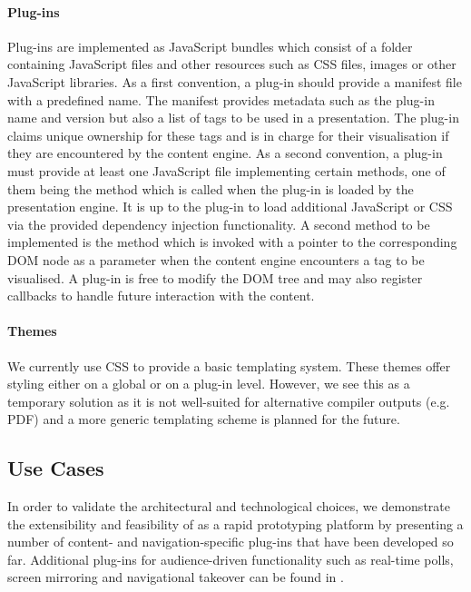 \documentclass[a4paper,12pt]{report}
\begin{document}
     \paragraph{Plug-ins} Plug-ins are implemented as JavaScript bundles which
      consist of a folder containing JavaScript files and other resources such
      as CSS files, images or other JavaScript libraries. As a first
      convention, a plug-in should provide a manifest file with a predefined
      name. The manifest provides metadata such as the plug-in name and version
      but also a list of tags to be used in a presentation. The plug-in claims
      unique ownership for these tags and is in charge for their visualisation
      if they are encountered by the content engine. As a second convention, a
      plug-in must provide at least one JavaScript file implementing certain
      methods, one of them being the  method which is called when
      the plug-in is loaded by the presentation engine. It is up to the plug-in
      to load additional JavaScript or CSS via the provided dependency
      injection functionality. A second method to be implemented is the
       method which is invoked with a pointer to the
      corresponding DOM node as a parameter when the content engine encounters
      a tag to be visualised. A plug-in is free to modify the DOM tree and may
      also register callbacks to handle future interaction with the content.

     \paragraph{Themes} We currently use CSS to provide a basic templating
      system. These themes offer styling either on a global or on a plug-in
      level. However, we see this as a temporary solution as it is not
      well-suited for alternative compiler outputs (e.g. PDF) and a more
      generic templating scheme is planned for the future.

   \subsection{Use Cases}

    In order to validate the architectural and technological choices, we
    demonstrate the extensibility and feasibility of \mxp as a rapid
    prototyping platform by presenting a number of content- and
    navigation-specific plug-ins that have been developed so far. Additional
    plug-ins for audience-driven functionality such as real-time polls, screen
    mirroring and navigational takeover can be found in \citep{roels-2}.
\end{document}
